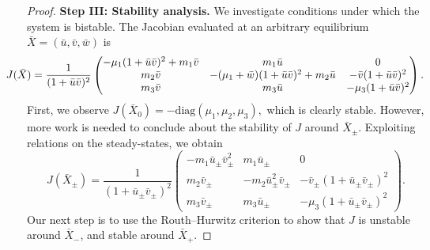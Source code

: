 \documentclass[12pt, a4paper]{amsart}
\numberwithin{equation}{section}
\newcommand{\diag}{\mathrm{diag}}
\newcommand{\CSS}{\bar{X}}
\def\mf{\mu_1}
\def\ml{\mu_2}
\def\me{\mu_3}
\def\bpm{\begin{pmatrix}}
\def\epm{\end{pmatrix}}
\begin{document}
\begin{proof}
\vspace{1em}
\noindent
\textbf{Step III: Stability analysis.}
We investigate conditions under which the system is bistable. The Jacobian evaluated at an arbitrary equilibrium $\CSS = (\bar u,\bar v,\bar w)$ is
$$ \hspace{-2em} J(\CSS) = \dfrac{1}{(1+ \bar u \bar v)^2}
\bpm
-\mf (1+ \bar u \bar v)^2 + m_1 \bar v & m_1 \bar u & 0 \\
m_2 \bar v & -(\mf + \bar w) (1+ \bar u \bar v)^2 + m_2 \bar u & -\bar v (1+ \bar u \bar v)^2 \\
m_3 \bar v & m_3 \bar u & -\mu_3 (1+ \bar u \bar v)^2
\epm.$$
First, we observe $J(\CSS_0) = -\diag(\mf, \ml, \me),$ which is clearly stable.
However, more work is needed to conclude about the stability of $J$ around $\CSS_\pm$. Exploiting relations on the steady-states, we obtain
$$ J(\CSS_\pm) = \dfrac{1}{(1 + \bar u_\pm \bar v_\pm)^2} \bpm -m_1 \bar u_\pm \bar v_\pm^2 & m_1 \bar u_\pm  & 0 \\ m_2 \bar v_\pm & -m_2 \bar u_\pm ^2 \bar v_\pm & -\bar v_\pm (1 + \bar u_\pm \bar v_\pm)^2 \\ m_3 \bar v_\pm & m_3 \bar u_\pm  & -\me (1 + \bar u_\pm \bar v_\pm)^2 \epm.$$
Our next step is to use the Routh--Hurwitz criterion to show that $J$ is unstable around $\bar X_-$, and stable around $\bar X_+$. 


\end{proof}
\end{document}
